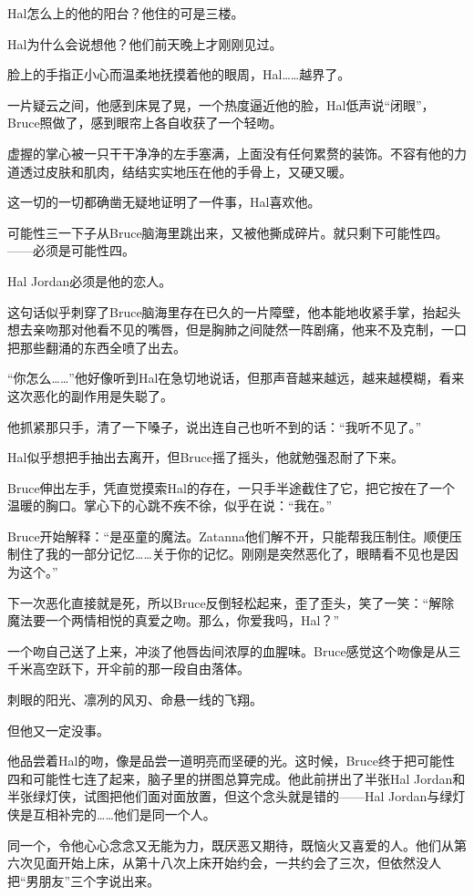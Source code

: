 \documentclass[../main.tex]{subfiles}
\begin{document}
Hal怎么上的他的阳台？他住的可是三楼。

Hal为什么会说想他？他们前天晚上才刚刚见过。

脸上的手指正小心而温柔地抚摸着他的眼周，Hal\ldots\ldots 越界了。

一片疑云之间，他感到床晃了晃，一个热度逼近他的脸，Hal低声说“闭眼”，Bruce照做了，感到眼帘上各自收获了一个轻吻。

虚握的掌心被一只干干净净的左手塞满，上面没有任何累赘的装饰。不容有他的力道透过皮肤和肌肉，结结实实地压在他的手骨上，又硬又暖。

这一切的一切都确凿无疑地证明了一件事，Hal喜欢他。

可能性三一下子从Bruce脑海里跳出来，又被他撕成碎片。就只剩下可能性四。——必须是可能性四。

Hal Jordan必须是他的恋人。

这句话似乎刺穿了Bruce脑海里存在已久的一片障壁，他本能地收紧手掌，抬起头想去亲吻那对他看不见的嘴唇，但是胸肺之间陡然一阵剧痛，他来不及克制，一口把那些翻涌的东西全喷了出去。

“你怎么\ldots\ldots”他好像听到Hal在急切地说话，但那声音越来越远，越来越模糊，看来这次恶化的副作用是失聪了。

他抓紧那只手，清了一下嗓子，说出连自己也听不到的话：“我听不见了。”

Hal似乎想把手抽出去离开，但Bruce摇了摇头，他就勉强忍耐了下来。

Bruce伸出左手，凭直觉摸索Hal的存在，一只手半途截住了它，把它按在了一个温暖的胸口。掌心下的心跳不疾不徐，似乎在说：“我在。”

Bruce开始解释：“是巫童的魔法。Zatanna他们解不开，只能帮我压制住。顺便压制住了我的一部分记忆\ldots\ldots 关于你的记忆。刚刚是突然恶化了，眼睛看不见也是因为这个。”

下一次恶化直接就是死，所以Bruce反倒轻松起来，歪了歪头，笑了一笑：“解除魔法要一个两情相悦的真爱之吻。那么，你爱我吗，Hal？”

一个吻自己送了上来，冲淡了他唇齿间浓厚的血腥味。Bruce感觉这个吻像是从三千米高空跃下，开伞前的那一段自由落体。

刺眼的阳光、凛冽的风刃、命悬一线的飞翔。

但他又一定没事。

他品尝着Hal的吻，像是品尝一道明亮而坚硬的光。这时候，Bruce终于把可能性四和可能性七连了起来，脑子里的拼图总算完成。他此前拼出了半张Hal
Jordan和半张绿灯侠，试图把他们面对面放置，但这个念头就是错的——Hal
Jordan与绿灯侠是互相补完的\ldots\ldots 他们是同一个人。

同一个，令他心心念念又无能为力，既厌恶又期待，既恼火又喜爱的人。他们从第六次见面开始上床，从第十八次上床开始约会，一共约会了三次，但依然没人把“男朋友”三个字说出来。
\end{document}
